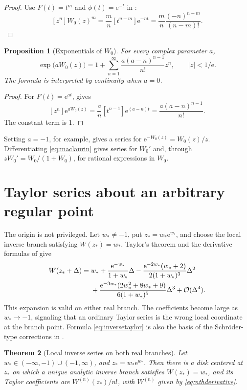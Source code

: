 \documentclass[11pt,openany]{book}
\newcommand{\e}{\mathrm{e}}
\newcommand{\Wzero}{W_0}
\newcommand{\bigO}{\mathcal{O}}
\newcommand{\abs}[1]{\left|#1\right|}
\theoremstyle{plain}
\newtheorem{theorem}{Theorem}[chapter]
\newtheorem{proposition}[theorem]{Proposition}
\theoremstyle{definition}
\theoremstyle{remark}
\begin{document}
\begin{proof}
Use \(F(t)=t^m\) and \(\phi(t)=\e^{-t}\) in
:
\[
 [z^n]W_0(z)^m
 =\frac mn[t^{n-m}]\e^{-nt}
 =\frac mn\frac{(-n)^{n-m}}{(n-m)!}.
\]
\end{proof}

\begin{proposition}[Exponentials of \(W_0\)]\label{prop:expwseries}
For every complex parameter \(a\),
\begin{equation}\label{eq:expwseries}
 \exp\!\bigl(a\Wzero(z)\bigr)
 =1+\sum_{n=1}^{\infty}
   \frac{a(a-n)^{n-1}}{n!}z^n,
 \qquad \abs z<1/\e.
\end{equation}
The formula is interpreted by continuity when \(a=0\).
\end{proposition}

\begin{proof}
For \(F(t)=\e^{at}\),  gives
\[
 [z^n]\e^{aW_0(z)}
 =\frac an[t^{n-1}]\e^{(a-n)t}
 =\frac{a(a-n)^{n-1}}{n!}.
\]
The constant term is \(1\).
\end{proof}

Setting \(a=-1\), for example, gives a series for
\(\e^{-W_0(z)}=W_0(z)/z\).  Differentiating \eqref{eq:maclaurin} gives
series for \(W_0'\) and, through
\(zW_0'=W_0/(1+W_0)\), for rational expressions in \(W_0\).

\section{Taylor series about an arbitrary regular point}
The origin is not privileged.  Let \(w_*\ne-1\), put
\(z_*=w_*\e^{w_*}\), and choose the local inverse branch satisfying
\(W(z_*)=w_*\).  Taylor's theorem and the derivative formulas of
 give
\begin{align}
 W(z_*+\Delta)
 ={}&w_*+\frac{\e^{-w_*}}{1+w_*}\Delta
 -\frac{\e^{-2w_*}(w_*+2)}{2(1+w_*)^3}\Delta^2\notag\\
 &+\frac{\e^{-3w_*}(2w_*^2+8w_*+9)}{6(1+w_*)^5}\Delta^3
 +\bigO(\Delta^4).
\label{eq:inversetaylor}
\end{align}
This expansion is valid on either real branch.  The coefficients become large
as \(w_*\to-1\), signaling that an ordinary Taylor series is the wrong local
coordinate at the branch point.  Formula \eqref{eq:inversetaylor} is also the
basis of the Schr\"oder-type corrections in .

\begin{theorem}[Local inverse series on both real branches]
Let \(w_*\in(-\infty,-1)\cup(-1,\infty)\), and
\(z_*=w_*\e^{w_*}\).  Then there is a disk centered at \(z_*\) on which a
unique analytic inverse branch satisfies \(W(z_*)=w_*\), and its Taylor
coefficients are \(W^{(n)}(z_*)/n!\), with \(W^{(n)}\) given by
\eqref{eq:nthderivative}.
\end{theorem}
\end{document}
